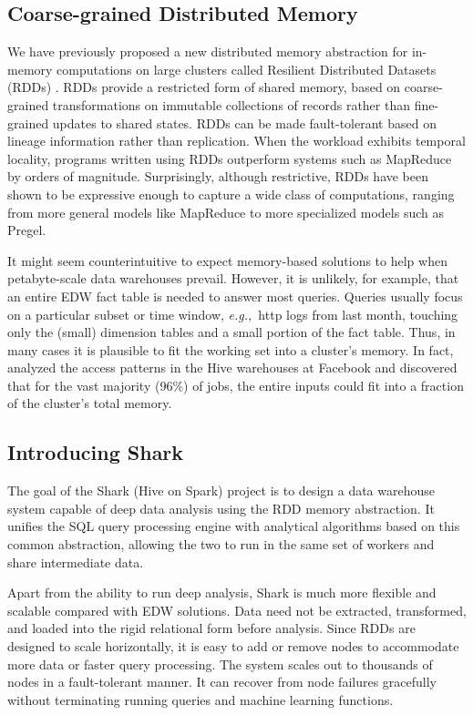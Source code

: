 \documentclass[preprint]{acm_proc_article-sp}
\newcommand{\eg}{{\em e.g.,}~}
\begin{document}
\subsection{Coarse-grained Distributed Memory}
We have previously proposed a new distributed memory abstraction for in-memory computations on large clusters called Resilient Distributed Datasets (RDDs) \cite{spark-tr}. RDDs provide a restricted form of shared memory, based on coarse-grained transformations on immutable collections of records rather than fine-grained updates to shared states. RDDs can be made fault-tolerant based on lineage information rather than replication. When the workload exhibits temporal locality, programs written using RDDs outperform systems such as MapReduce by orders of magnitude. Surprisingly, although restrictive, RDDs have been shown to be expressive enough to capture a wide class of computations, ranging from more general models like MapReduce to more specialized models such as Pregel.

It might seem counterintuitive to expect memory-based solutions to help when petabyte-scale data warehouses prevail. However, it is unlikely, for example, that an entire EDW fact table is needed to answer most queries. Queries usually focus on a particular subset or time window, \eg http logs from last month, touching only the (small) dimension tables and a small portion of the fact table. Thus, in many cases it is plausible to fit the working set into a cluster's memory. In fact, \cite{memento-hotos} analyzed the access patterns in the Hive warehouses at Facebook and discovered that for the vast majority (96\%) of jobs, the entire inputs could fit into a fraction of the cluster's total memory.

\subsection{Introducing Shark}
The goal of the Shark (Hive on Spark) project is to design a data warehouse system capable of deep data analysis using the RDD memory abstraction. It unifies the SQL query processing engine with analytical algorithms based on this common abstraction, allowing the two to run in the same set of workers and share intermediate data.

Apart from the ability to run deep analysis, Shark is much more flexible and scalable compared with EDW solutions. Data need not be extracted, transformed, and loaded into the rigid relational form before analysis. Since RDDs are designed to scale horizontally, it is easy to add or remove nodes to accommodate more data or faster query processing. The system scales out to thousands of nodes in a fault-tolerant manner. It can recover from node failures gracefully without terminating running queries and machine learning functions.
\end{document}
